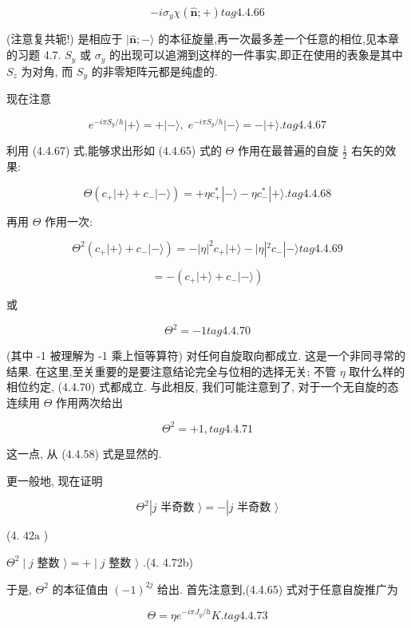 $$
- i{\sigma }_{y}\chi \left( {\widehat{\mathbf{n}}; + }\right) tag{4. 4.66}
$$

(注意复共轭!) 是相应于 $|\widehat{\mathbf{n}}; - \rangle$ 的本征旋量,再一次最多差一个任意的相位,见本章的习题 4.7. ${S}_{y}$ 或 ${\sigma }_{y}$ 的出现可以追溯到这样的一件事实,即正在使用的表象是其中 ${S}_{z}$ 为对角, 而 ${S}_{y}$ 的非零矩阵元都是纯虚的.

现在注意

$$
{e}^{-{i\pi }{S}_{y}/h}\left| {+\rangle = + }\right| - \rangle ,\;{e}^{-{i\pi }{S}_{y}/h}\left| {-\rangle = - }\right| + \rangle . tag{4. 4.67}
$$

利用 (4.4.67) 式,能够求出形如 (4.4.65) 式的 $\Theta$ 作用在最普遍的自旋 $\frac{1}{2}$ 右矢的效果:

$$
\Theta \left( {{c}_{ + }\left| {+\rangle + {c}_{ - }}\right| - \rangle }\right) = + \eta {c}_{ + }^{ * }\left| {-\rangle - \eta {c}_{ - }^{ * }}\right| + \rangle . tag{4. 4.68}
$$

再用 $\Theta$ 作用一次:

$$
{\Theta }^{2}\left( {{c}_{ + }\left| {+\rangle + {c}_{ - }}\right| - \rangle }\right) = - {\left| \eta \right| }^{2}{c}_{ + }\left| {+\rangle - }\right| \eta \left| {{}^{2}{c}_{ - }}\right| - \rangle tag{4. 4.69}
$$

$$
= - \left( {{c}_{ + }\left| {+\rangle + {c}_{ - }}\right| - \rangle }\right)
$$

或

$$
{\Theta }^{2} = - 1 tag{4. 4. 70}
$$

(其中 -1 被理解为 -1 乘上恒等算符) 对任何自旋取向都成立. 这是一个非同寻常的结果. 在这里,至关重要的是要注意结论完全与位相的选择无关; 不管 $\eta$ 取什么样的相位约定, (4.4.70) 式都成立. 与此相反, 我们可能注意到了, 对于一个无自旋的态连续用 $\Theta$ 作用两次给出

$$
{\Theta }^{2} = + 1, tag{4. 4.71}
$$

这一点, 从 (4.4.58) 式是显然的.

更一般地, 现在证明

$$
{\Theta }^{2}\left| {j\text{ 半奇数 }\rangle = - }\right| j\text{ 半奇数 }\rangle
$$

(4. ${42}\mathrm{a}$ )

${\Theta }^{2} \mid j$ 整数 $\rangle = + \mid j$ 整数 $\rangle$ .(4. 4.72b)

于是, ${\Theta }^{2}$ 的本征值由 ${\left( -1\right) }^{2j}$ 给出. 首先注意到,(4.4.65) 式对于任意自旋推广为

$$
\Theta = \eta {e}^{-{i\pi }{J}_{y}/h}K. tag{4. 4.73}
$$

